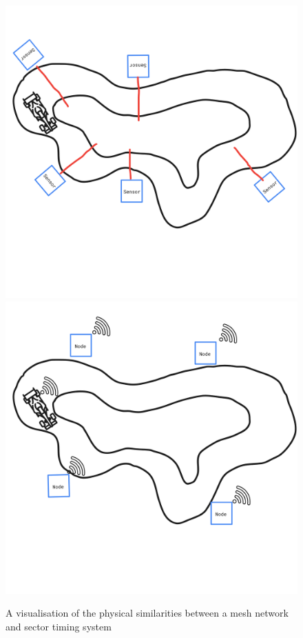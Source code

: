 \documentclass[journal]{IEEEtran}
\begin{document}
\begin{figure}[t]
    \includegraphics[width=\linewidth]{images/car_and_sensors.png}
    \includegraphics[width=\linewidth]{images/car_and_nodes.png}
    \caption{A visualisation of the physical similarities between a mesh network and sector timing system}
    \label{fig:node_sensor_compare}
\end{figure}
\end{document}
